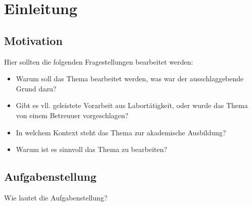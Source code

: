 \chapter{Einleitung}
\section{Motivation}
Hier sollten die folgenden Fragestellungen bearbeitet werden:

\begin{itemize}
	\item Warum soll das Thema bearbeitet werden, was war der ausschlaggebende Grund dazu?
	\item Gibt es vll. geleistete Vorarbeit aus Labortätigkeit, oder wurde das Thema von einem Betreuuer vorgeschlagen?
	\item In welchem Kontext steht das Thema zur akademische Ausbildung?
	\item Warum ist es sinnvoll das Thema zu bearbeiten?
\end{itemize}

\section{Aufgabenstellung}
Wie lautet die Aufgabenstellung? \cite{Nobody06}